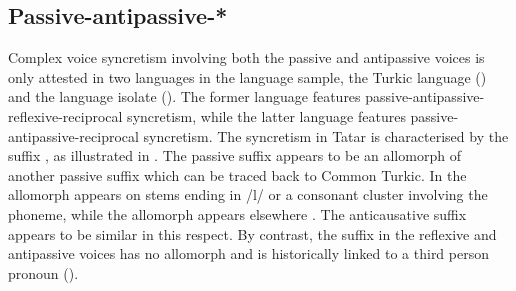 \subsection{Passive-antipassive-*} \label{sec:complex-syncretism:pass-antp}
Complex voice syncretism involving both the passive and antipassive voices is only attested in two languages in the language sample, the Turkic language  () and the language isolate  (). The former language features passive-antipassive-reflexive-reciprocal syncretism, while the latter language features passive-antipassive-reciprocal syncretism. The syncretism in Tatar is cha\-rac\-te\-ri\-sed by the suffix , as illustrated in . The passive suffix  appears to be an allomorph of another passive suffix  which can be traced back to Common Turkic. In  the allomorph  appears on stems ending in /l/ or a consonant cluster involving the phoneme, while the allomorph  appears elsewhere \citep[473]{burbiel:2018}. The anticausative suffix  appears to be similar in this respect. By contrast, the suffix  in the reflexive and antipassive voices has no allomorph  and is historically linked to a third person pronoun ().

